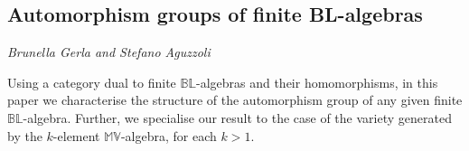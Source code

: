 \documentclass[../booklet.tex]{subfiles}
\begin{document}
\subsection[Automorphism groups of finite BL-algebras. {\it Brunella Gerla and Stefano Aguzzoli}]{Automorphism groups of finite BL-algebras}
 

\begin{center}
  {\it Brunella Gerla and Stefano Aguzzoli}
\end{center}

\vskip 0.8cm


Using a category dual to finite $\mathbb{BL}$-algebras and their homomorphisms,
in this paper
we characterise the structure of the automorphism group of any given finite $\mathbb{BL}$-algebra.
Further, we specialise
our result to the case of the variety generated by the $k$-element $\mathbb{MV}$-algebra, for each $k > 1$.

\end{document}
